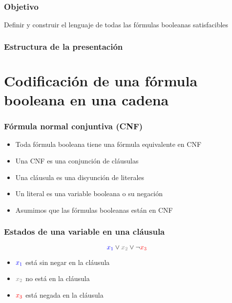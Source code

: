 \documentclass{beamer}
\begin{document}
\begin{frame}
    \frametitle{Objetivo}
    
    Definir y construir el lenguaje de todas las fórmulas booleanas satisfacibles    
\end{frame}

\begin{frame}
    \frametitle{Estructura de la presentación}
    
    \tableofcontents
\end{frame}

\section{Codificación de una fórmula booleana en una cadena}
\begin{frame}
    \frametitle{Fórmula normal conjuntiva (CNF)}
    
    \begin{itemize}
        \item Toda fórmula booleana tiene una fórmula equivalente en CNF
              \pause
        \item Una CNF es una conjunción de cláusulas
              \pause
        \item Una cláusula es una disyunción de literales
              \pause
        \item Un literal es una variable booleana o su negación
              \pause
        \item Asumimos que las fórmulas booleanas están en CNF
    \end{itemize}
    
\end{frame}

\begin{frame}

    \frametitle{Estados de una variable en una cláusula}
    
    \begin{Large}    
        $$\textcolor{blue}{x_1}\vee \textcolor{gray}{x_2}\vee \neg \textcolor{red}{x_3}$$
    \end{Large}
    
    \pause
    \vspace{1cm}
    \begin{itemize}
        \item  $\textcolor{blue}{x_1}$ está sin negar en la cláusula
              \pause
        \item  $\textcolor{gray}{x_2}$ no está en la cláusula
              \pause
        \item $\textcolor{red}{x_3}$ está negada en la cláusula
    \end{itemize}
\end{frame}
\end{document}
